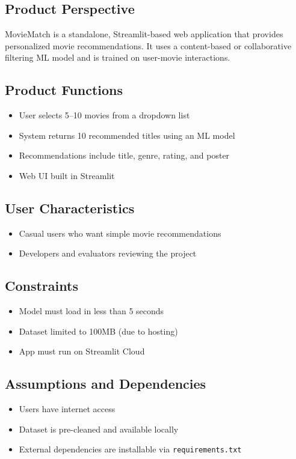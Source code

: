 \documentclass{article}
\begin{document}
\subsection{Product Perspective}
MovieMatch is a standalone, Streamlit-based web application that provides personalized movie recommendations. It uses a content-based or collaborative filtering ML model and is trained on user-movie interactions.

\subsection{Product Functions}
\begin{itemize}
    \item User selects 5–10 movies from a dropdown list
    \item System returns 10 recommended titles using an ML model
    \item Recommendations include title, genre, rating, and poster
    \item Web UI built in Streamlit
\end{itemize}

\subsection{User Characteristics}
\begin{itemize}
    \item Casual users who want simple movie recommendations
    \item Developers and evaluators reviewing the project
\end{itemize}

\subsection{Constraints}
\begin{itemize}
    \item Model must load in less than 5 seconds
    \item Dataset limited to 100MB (due to hosting)
    \item App must run on Streamlit Cloud
\end{itemize}

\subsection{Assumptions and Dependencies}
\begin{itemize}
    \item Users have internet access
    \item Dataset is pre-cleaned and available locally
    \item External dependencies are installable via \texttt{requirements.txt}
\end{itemize}
\end{document}

